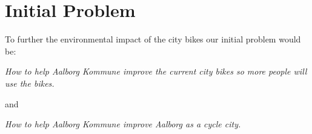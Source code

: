 \section*{Initial Problem}
To further the environmental impact of the city bikes our initial problem would be:

\textit{How to help Aalborg Kommune improve the current city bikes so more people will use the bikes.}
\begin{center}
and
\end{center}
\textit{How to help Aalborg Kommune improve Aalborg as a cycle city.}